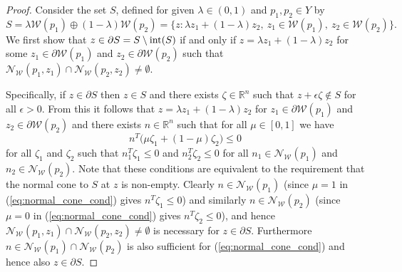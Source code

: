 \documentclass[smallextended]{svjour3}       %
\numberwithin{equation}{section}
\begin{document}
%
\begin{proof}
  Consider the set $S$, defined for given $\lambda\in (0,1)$ and $p_1,p_2\in Y$ by
  \[
    S = \lambda \mathcal{W}(p_1) \oplus (1-\lambda) \mathcal{W}(p_2) 
      = \bigl\{ z : \lambda z_1 + (1 - \lambda) z_2, \ z_1 \in\mathcal W(p_1), \ z_2 \in\mathcal W(p_2) \bigr\} .
  \]
  We first show that $z\in \partial S = S \setminus \textup{int}(S)$ if and only if
  $z = \lambda z_1 + (1 - \lambda) z_2$ for some $z_1\in\partial \mathcal W(p_1)$ and $z_2\in\partial \mathcal W(p_2)$ such that $\mathcal N_{\mathcal W}(p_1,z_1) \cap \mathcal N_{\mathcal W}(p_2,z_2) \neq \emptyset$.
  
  Specifically, if $z\in \partial S$ then $z\in S$ and there exists $\zeta\in\mathbb R^n$ such that $z + \epsilon \zeta \notin S$ for all $\epsilon > 0$.
  From this it follows that $z = \lambda z_1 + (1-\lambda ) z_2$ for $z_1\in\partial \mathcal W(p_1)$ and $z_2\in\partial \mathcal W(p_2)$ and there exists $n\in \mathbb R^n$ such that for all $\mu \in [0,1]$ we have
  \begin{equation}\label{eq:normal_cone_cond}
    n^T \bigl( \mu \zeta_1 + (1-\mu) \zeta_2 \bigr) \leq 0 
  \end{equation}
  for all $\zeta_1$ and $\zeta_2$ such that $n_1^T\zeta_1 \leq 0$ and $n_2^T\zeta_2 \leq 0$ for all $n_1\in\mathcal N_{\mathcal W}(p_1)$ and $n_2\in\mathcal N_{\mathcal W}(p_2)$. Note that these conditions are equivalent to the requirement that the normal cone to $S$ at $z$ is non-empty.
  Clearly $n\in \mathcal N_{\mathcal W}(p_1)$ (since $\mu = 1$ in (\ref{eq:normal_cone_cond}) gives $n^T\zeta_1 \leq 0$) and similarly $n\in \mathcal N_{\mathcal W}(p_2)$ (since $\mu = 0$ in (\ref{eq:normal_cone_cond}) gives $n^T\zeta_2 \leq 0$), and hence $\mathcal N_{\mathcal W}(p_1,z_1) \cap \mathcal N_{\mathcal W}(p_2,z_2) \neq \emptyset$ is necessary for $z\in\partial S$.
  Furthermore $n\in \mathcal N_{\mathcal W}(p_1)\cap \mathcal N_{\mathcal W}(p_2)$ is also sufficient for (\ref{eq:normal_cone_cond}) and hence also $z\in\partial S$.


\end{proof}
\end{document}
